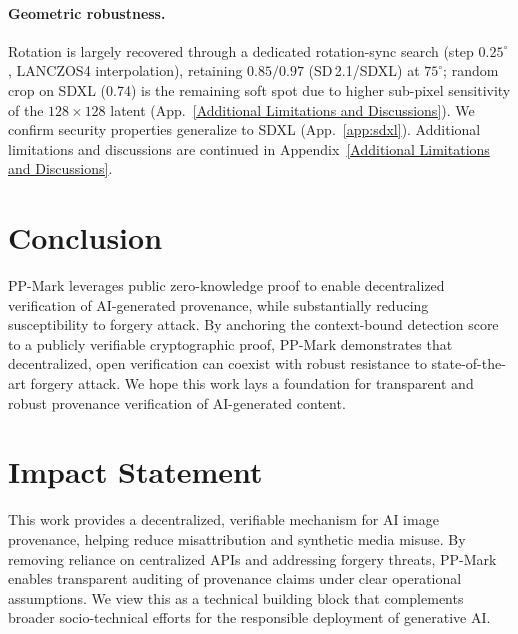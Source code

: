 \documentclass{article}
\theoremstyle{plain}
\theoremstyle{definition}
\theoremstyle{remark}
\begin{document}
\paragraph{Geometric robustness.} Rotation is largely recovered through a dedicated rotation-sync search (step $0.25^\circ$, LANCZOS4 interpolation), retaining $0.85/0.97$ (SD\,2.1/SDXL) at $75^\circ$; random crop on SDXL (0.74) is the remaining soft spot due to higher sub-pixel sensitivity of the $128{\times}128$ latent (App.~\ref{Additional Limitations and Discussions}). We confirm security properties generalize to SDXL (App.~\ref{app:sdxl}). Additional limitations and discussions are continued in Appendix~\ref{Additional Limitations and Discussions}.

\section{Conclusion}
PP-Mark leverages public zero-knowledge proof to enable decentralized verification of AI-generated provenance, while substantially reducing susceptibility to forgery attack. By anchoring the context-bound detection score to a publicly verifiable cryptographic proof, PP-Mark demonstrates that decentralized, open verification can coexist with robust resistance to state-of-the-art forgery attack. We hope this work lays a foundation for transparent and robust provenance verification of AI-generated content.

\section*{Impact Statement}
This work provides a decentralized, verifiable mechanism for AI image provenance, helping reduce misattribution and synthetic media misuse. By removing reliance on centralized APIs and addressing forgery threats, PP-Mark enables transparent auditing of provenance claims under clear operational assumptions. We view this as a technical building block that complements broader socio-technical efforts for the responsible deployment of generative AI.






\end{document}
